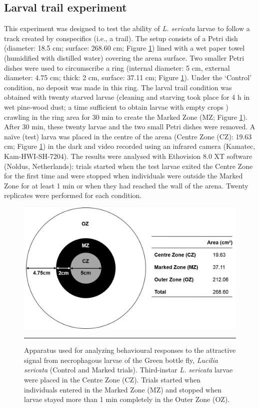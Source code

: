 			\subsection{Larval trail experiment}
This experiment was designed to test the ability of \textit{L. sericata} larvae to follow a track created by conspecifics (i.e., a trail). The setup consists of a Petri dish (diameter: 18.5 cm; surface: 268.60 cm; Figure \ref{fig:setup}) lined with a wet paper towel (humidified with distilled water) covering the arena surface. Two smaller Petri dishes were used to circumscribe a ring (internal diameter: 5 cm, external diameter: 4.75 cm; thick: 2 cm, surface: 37.11 cm; Figure \ref{fig:setup}). Under the ‘Control’ condition, no deposit was made in this ring. The larval trail condition was obtained with twenty starved larvae (cleaning and starving took place for 4 h in wet pine-wood dust; a time sufficient to obtain larvae with empty crops \cite{charabidze_discontinuous_2013}) crawling in the ring area for 30 min to create the Marked Zone (MZ; Figure \ref{fig:setup}). After 30 min, these twenty larvae and the two small Petri dishes were removed. A naïve (test) larva was placed in the centre of the arena (Centre Zone (CZ): 19.63 cm; Figure \ref{fig:setup}) in the dark and video recorded using an infrared camera (Kamatec, Kam-HWI-SH-7204). The results were analysed with Ethovision 8.0 XT software (Noldus, Netherlands): trials started when the test larvae exited the Centre Zone for the first time and were stopped when individuals were outside the Marked Zone for at least 1 min or when they had reached the wall of the arena. Twenty replicates were performed for each condition. 

\begin{figure}[ht]
	\centering
		\includegraphics[width=0.9 \textwidth]{Figures/fig1.png}
		\rule{35em}{0.5pt}
	\caption[Setup]{Apparatus used for analyzing behavioural responses to the attractive signal from necrophagous larvae of the Green bottle fly, \textit{Lucilia sericata} (Control and Marked trials). Third-instar \textit{L. sericata} larvae were placed in the Centre Zone (CZ). Trials started when individuals entered in the Marked Zone (MZ) and stopped when larvae stayed more than 1 min completely in the Outer Zone (OZ).}
	\label{fig:setup}
\end{figure}

